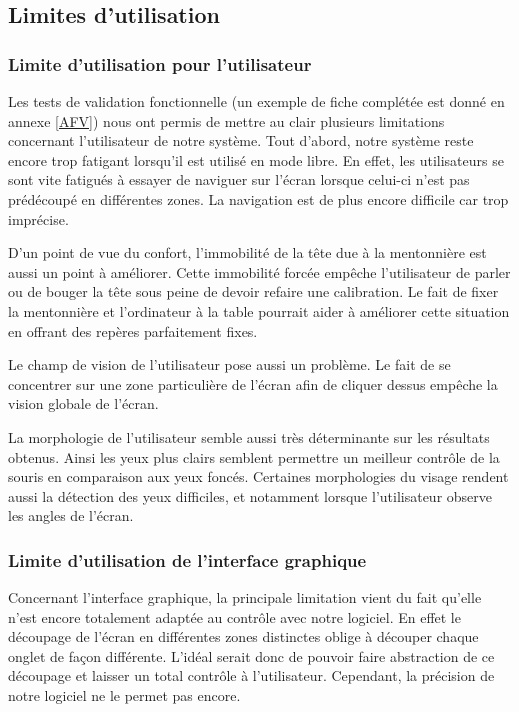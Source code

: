 \subsection{Limites d'utilisation}

\subsubsection{Limite d’utilisation pour l’utilisateur}

Les tests de validation fonctionnelle (un exemple de fiche complétée est donné en annexe \ref{AFV}) nous ont permis de mettre au clair plusieurs limitations concernant l’utilisateur de notre système. Tout d’abord, notre système reste encore trop fatigant lorsqu’il est utilisé en mode libre. En effet, les utilisateurs se sont vite fatigués à essayer de naviguer sur l’écran lorsque celui-ci n’est pas prédécoupé en différentes zones. La navigation est de plus encore difficile car trop imprécise.

D’un point de vue du confort, l’immobilité de la tête due à la mentonnière est aussi un point à améliorer. Cette immobilité forcée empêche l’utilisateur de parler ou de bouger la tête sous peine de devoir refaire une calibration. Le fait de fixer la mentonnière et l’ordinateur à la table pourrait aider à améliorer cette situation en offrant des repères parfaitement fixes.

Le champ de vision de l’utilisateur pose aussi un problème. Le fait de se concentrer sur une zone particulière de l’écran afin de cliquer dessus empêche la vision globale de l’écran.

La morphologie de l’utilisateur semble aussi très déterminante sur les résultats obtenus. Ainsi les yeux plus clairs semblent permettre un meilleur contrôle de la souris en comparaison aux yeux foncés. Certaines morphologies du visage rendent aussi la détection des yeux difficiles, et notamment lorsque l’utilisateur observe les angles de l’écran.

\subsubsection{Limite d’utilisation de l’interface graphique}

Concernant l’interface graphique, la principale limitation vient du fait qu’elle n’est encore totalement adaptée au contrôle avec notre logiciel. En effet le découpage de l’écran en différentes zones distinctes oblige à découper chaque onglet de façon différente. L’idéal serait donc de pouvoir faire abstraction de ce découpage et laisser un total contrôle à l’utilisateur. Cependant, la précision de notre logiciel ne le permet pas encore.

